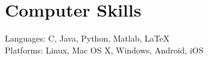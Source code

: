 \section{\sc Computer Skills}
Languages: C, Java, Python, Matlab, \LaTeX\\
Platforms: Linux, Mac OS X, Windows, Android, iOS
